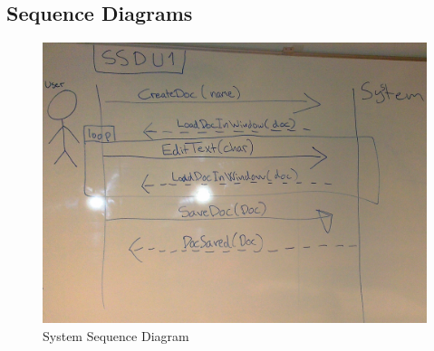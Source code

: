 \subsection{Sequence Diagrams}
\begin{figure}[H]
  \includegraphics[width=\textwidth]{illustrations/SystemStateDiagram.jpg}
  \caption{System Sequence Diagram}
  \label{systemsequencediagram}
\end{figure}
